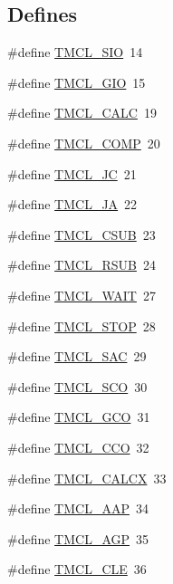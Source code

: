 \subsection*{Defines}
\begin{DoxyCompactItemize}
\item 
\#define \hyperlink{group__TMCLComm_gac92473e5d6624712eb0c6e3b96e72556}{TMCL\_\-SIO}~14
\item 
\#define \hyperlink{group__TMCLComm_gaf8c91f7e3398565e620f87695e2ac8aa}{TMCL\_\-GIO}~15
\item 
\#define \hyperlink{group__TMCLComm_gaaca5ca8ff4397dde2a1d974a08dfc97d}{TMCL\_\-CALC}~19
\item 
\#define \hyperlink{group__TMCLComm_gab3445bd6ed45c31f3ed3f4db49914bbd}{TMCL\_\-COMP}~20
\item 
\#define \hyperlink{group__TMCLComm_gae98b22b798475ff3262efec2168b98a1}{TMCL\_\-JC}~21
\item 
\#define \hyperlink{group__TMCLComm_ga7516bcd7048ea0be08c282cfb65232dc}{TMCL\_\-JA}~22
\item 
\#define \hyperlink{group__TMCLComm_ga42c0ac92b2357e8833d3294b36f3ce03}{TMCL\_\-CSUB}~23
\item 
\#define \hyperlink{group__TMCLComm_gab5dbf5f5909e2c59d70ddf48dd6d68fe}{TMCL\_\-RSUB}~24
\item 
\#define \hyperlink{group__TMCLComm_ga3c134dcd5083b786adf60d3240cdee87}{TMCL\_\-WAIT}~27
\item 
\#define \hyperlink{group__TMCLComm_ga85496061c9785e9cc81068564f72d11a}{TMCL\_\-STOP}~28
\item 
\#define \hyperlink{group__TMCLComm_gaa5bb837c0debc7de9548dcd55f233cda}{TMCL\_\-SAC}~29
\item 
\#define \hyperlink{group__TMCLComm_ga98541d48d1c0ae966624414f02869164}{TMCL\_\-SCO}~30
\item 
\#define \hyperlink{group__TMCLComm_gadfdbd63f01a0e7148e6ad2ac5c7aa3f1}{TMCL\_\-GCO}~31
\item 
\#define \hyperlink{group__TMCLComm_ga55f02944bc20337ded009ae3a22a2e19}{TMCL\_\-CCO}~32
\item 
\#define \hyperlink{group__TMCLComm_gad58eac496f0281febc26c7302e0f7236}{TMCL\_\-CALCX}~33
\item 
\#define \hyperlink{group__TMCLComm_gadda3b3b029a3c196e05bc3fbb6e9f4c0}{TMCL\_\-AAP}~34
\item 
\#define \hyperlink{group__TMCLComm_gae139fce6d594db73457f09527562468c}{TMCL\_\-AGP}~35
\item 
\#define \hyperlink{group__TMCLComm_gadf8bf4f9343f77c0787ab0f131fbc92a}{TMCL\_\-CLE}~36

\end{DoxyCompactItemize}
